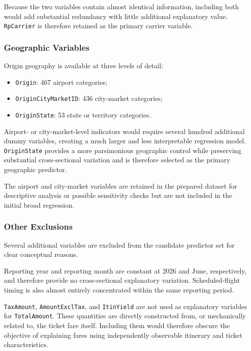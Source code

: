 \documentclass[11pt,a4paper]{article}
\begin{document}
Because the two variables contain almost identical information, including both would add substantial redundancy with little additional explanatory value. \texttt{RpCarrier} is therefore retained as the primary carrier variable.

\subsubsection{Geographic Variables}

Origin geography is available at three levels of detail:

\begin{itemize}
    \item \texttt{Origin}: 467 airport categories;
    \item \texttt{OriginCityMarketID}: 436 city-market categories;
    \item \texttt{OriginState}: 53 state or territory categories.
\end{itemize}

Airport- or city-market-level indicators would require several hundred additional dummy variables, creating a much larger and less interpretable regression model. \texttt{OriginState} provides a more parsimonious geographic control while preserving substantial cross-sectional variation and is therefore selected as the primary geographic predictor.

The airport and city-market variables are retained in the prepared dataset for descriptive analysis or possible sensitivity checks but are not included in the initial broad regression.

\subsubsection{Other Exclusions}

Several additional variables are excluded from the candidate predictor set for clear conceptual reasons.

Reporting year and reporting month are constant at 2026 and June, respectively, and therefore provide no cross-sectional explanatory variation. Scheduled-flight timing is also almost entirely concentrated within the same reporting period.

\texttt{TaxAmount}, \texttt{AmountExclTax}, and \texttt{ItinYield} are not used as explanatory variables for \texttt{TotalAmount}. These quantities are directly constructed from, or mechanically related to, the ticket fare itself. Including them would therefore obscure the objective of explaining fares using independently observable itinerary and ticket characteristics.
\end{document}
